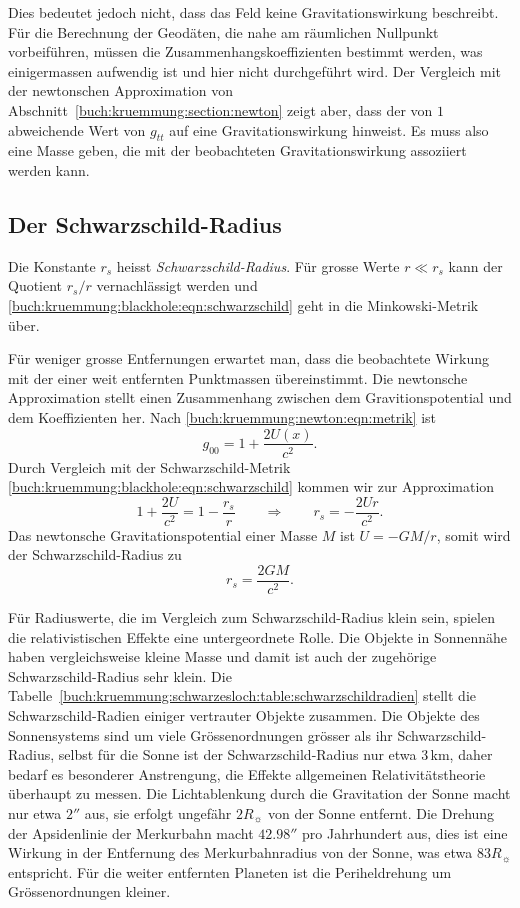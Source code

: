 Dies bedeutet jedoch nicht, dass das Feld keine Gravitationswirkung
beschreibt.
Für die Berechnung der Geodäten, die nahe am räumlichen
Nullpunkt vorbeiführen, müssen die Zusammenhangskoeffizienten
bestimmt werden, was einigermassen aufwendig ist und hier nicht
durchgeführt wird.
Der Vergleich mit der newtonschen Approximation von
Abschnitt~\ref{buch:kruemmung:section:newton}
zeigt aber, dass der von $1$ abweichende Wert von $g_{tt}$ auf
eine Gravitationswirkung hinweist.
Es muss also eine Masse geben, die mit der beobachteten Gravitationswirkung
assoziiert werden kann.

\subsection{Der Schwarzschild-Radius}
%
Die Konstante $r_s$ heisst \emph{Schwarzschild-Radius}.
%
Für grosse Werte $r\ll r_s$ kann der Quotient $r_s/r$ vernachlässigt
werden und \eqref{buch:kruemmung:blackhole:eqn:schwarzschild} geht
in die Minkowski-Metrik über.

Für weniger grosse Entfernungen erwartet man, dass die beobachtete
Wirkung mit der einer weit entfernten Punktmassen übereinstimmt.
Die newtonsche Approximation stellt einen Zusammenhang zwischen
dem Gravitionspotential und dem Koeffizienten her.
Nach \eqref{buch:kruemmung:newton:eqn:metrik} ist
\[
g_{00} = 1+\frac{2U(x)}{c^2}.
\]
Durch Vergleich mit der Schwarzschild-Metrik
\eqref{buch:kruemmung:blackhole:eqn:schwarzschild}
kommen wir zur Approximation
\[
1
+
\frac{2U}{c^2}
=
1
-
\frac{r_s}{r}
\qquad\Rightarrow\qquad
r_s
=
-
\frac{2Ur}{c^2}.
\]
Das newtonsche Gravitationspotential einer Masse $M$ ist $U=-GM/r$,
somit wird der Schwarzschild-Radius zu
\[
r_s
=
\frac{2GM}{c^2}.
\]

Für Radiuswerte, die im Vergleich zum Schwarzschild-Radius klein sein,
spielen die relativistischen Effekte eine untergeordnete Rolle.
Die Objekte in Sonnennähe haben vergleichsweise kleine Masse und damit
ist auch der zugehörige Schwarzschild-Radius sehr klein.
Die Tabelle~\ref{buch:kruemmung:schwarzesloch:table:schwarzschildradien}
stellt die Schwarzschild-Radien einiger vertrauter Objekte zusammen.
Die Objekte des Sonnensystems sind um viele Grössenordnungen grösser
als ihr Schwarzschild-Radius, selbst für die Sonne ist der
Schwarzschild-Radius nur etwa 3\,km, daher bedarf es besonderer 
Anstrengung, die Effekte allgemeinen Relativitätstheorie überhaupt
zu messen.
Die Lichtablenkung durch die Gravitation der Sonne macht nur etwa
$2''$ aus, sie erfolgt ungefähr $2R_{\sun}$ von der Sonne entfernt.
Die Drehung der Apsidenlinie der Merkurbahn macht $42.98''$ pro
Jahrhundert aus, dies ist eine Wirkung in der Entfernung des
Merkurbahnradius von der Sonne, was etwa $83R_{\sun}$ entspricht.
Für die weiter entfernten Planeten ist die Periheldrehung um Grössenordnungen
kleiner.

